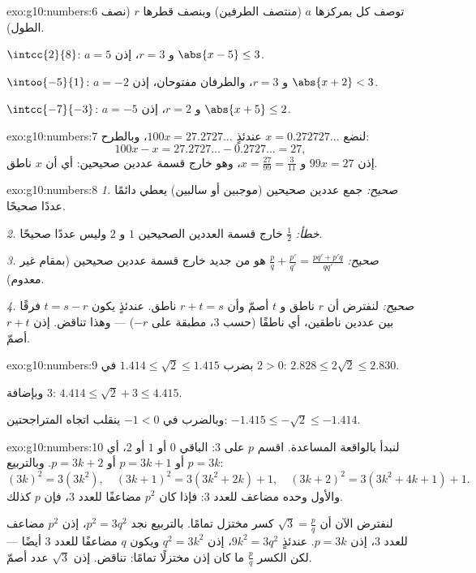 \begin{solution}{exo:g10:numbers:6}
توصف كل  بمركزها $a$ (منتصف الطرفين) وبنصف قطرها $r$
(نصف الطول).

$\intcc{2}{8}$: $a = 5$ و $r = 3$، إذن $\abs{x - 5} \leq 3$.

$\intoo{-5}{1}$: $a = -2$ و $r = 3$، والطرفان مفتوحان، إذن $\abs{x + 2} < 3$.

$\intcc{-7}{-3}$: $a = -5$ و $r = 2$، إذن $\abs{x + 5} \leq 2$.
\end{solution}

\begin{solution}{exo:g10:numbers:7}
لنضع $x = 0.272727\dots$ عندئذٍ $100x = 27.2727\dots$، وبالطرح:
\[
100x - x = 27.2727\dots - 0.2727\dots = 27,
\]
إذن $99x = 27$ و $x = \frac{27}{99} = \frac{3}{11}$، وهو خارج قسمة
عددين صحيحين: أي أن $x$ ناطق.
\end{solution}

\begin{solution}{exo:g10:numbers:8}
\emph{1. صحيح:} جمع عددين صحيحين (موجبين أو سالبين)
يعطي دائمًا عددًا صحيحًا.

\emph{2. خطأ:} $\frac{1}{2}$ خارج قسمة العددين الصحيحين $1$ و $2$
وليس عددًا صحيحًا.

\emph{3. صحيح:} $\frac pq + \frac{p'}{q'} = \frac{pq' + p'q}{qq'}$ هو
من جديد خارج قسمة عددين صحيحين (بمقام غير معدوم).

\emph{4. صحيح:} لنفترض أن $r$ ناطق و $t$ أصمّ وأن $r + t = s$
ناطق. عندئذٍ يكون $t = s - r$ فرقًا بين عددين ناطقين،
أي ناطقًا (حسب 3، مطبقة على $-r$) --- وهذا تناقض. إذن $r + t$
أصمّ.
\end{solution}

\begin{solution}{exo:g10:numbers:9}
بضرب $1.414 \leq \sqrt2 \leq 1.415$ في $2 > 0$:
$2.828 \leq 2\sqrt2 \leq 2.830$.

وبإضافة $3$: $4.414 \leq \sqrt2 + 3 \leq 4.415$.

وبالضرب في $-1 < 0$ ينقلب اتجاه المتراجحتين:
$-1.415 \leq -\sqrt2 \leq -1.414$.
\end{solution}

\begin{solution}{exo:g10:numbers:10}
لنبدأ بالواقعة المساعدة. اقسم $p$ على $3$: الباقي $0$ أو $1$ أو
$2$، أي $p = 3k$ أو $p = 3k+1$ أو $p = 3k+2$. وبالتربيع:
\[
(3k)^2 = 3(3k^2), \quad
(3k+1)^2 = 3(3k^2 + 2k) + 1, \quad
(3k+2)^2 = 3(3k^2 + 4k + 1) + 1 .
\]
والأول وحده مضاعف للعدد $3$: فإذا كان $p^2$ مضاعفًا للعدد $3$، فإن
$p$ كذلك.

لنفترض الآن أن $\sqrt3 = \frac pq$ كسر مختزل تمامًا. بالتربيع نجد
$p^2 = 3q^2$، إذن $p^2$ مضاعف للعدد $3$، إذن $p = 3k$. عندئذٍ
$9k^2 = 3q^2$، إذن $q^2 = 3k^2$ ويكون $q$ مضاعفًا للعدد $3$ أيضًا ---
لكن الكسر $\frac pq$ ما كان إذن مختزلًا تمامًا: تناقض. إذن
$\sqrt3$ عدد أصمّ.
\end{solution}

